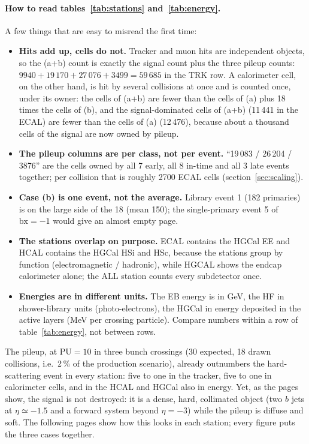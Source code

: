 \documentclass[11pt,a4paper]{article}
\newcommand{\bx}{\ensuremath{\mathrm{bx}}}
\begin{document}
\paragraph{How to read tables~\ref{tab:stations} and~\ref{tab:energy}.} A few things that are easy to misread
the first time:
\begin{itemize}
\item \textbf{Hits add up, cells do not.} Tracker and muon hits are independent objects, so the (a+b) count is
  exactly the signal count plus the three pileup counts: $9940 + 19\,170 + 27\,076 + 3499 = 59\,685$ in the
  TRK row. A calorimeter cell, on the other hand, is hit by several collisions at once and is counted once,
  under its owner: the cells of (a+b) are fewer than the cells of (a) plus 18 times the cells of (b), and the
  signal-dominated cells of (a+b) (11\,441 in the ECAL) are fewer than the cells of (a) (12\,476), because
  about a thousand cells of the signal are now owned by pileup.
\item \textbf{The pileup columns are per class, not per event.} ``19\,083 / 26\,204 / 3876'' are the cells
  owned by all 7 early, all 8 in-time and all 3 late events together; per collision that is roughly 2700 ECAL
  cells (section~\ref{sec:scaling}).
\item \textbf{Case (b) is one event, not the average.} Library event 1 (182 primaries) is on the large side of
  the 18 (mean 150); the single-primary event 5 of $\bx=-1$ would give an almost empty page.
\item \textbf{The stations overlap on purpose.} ECAL contains the HGCal EE and HCAL contains the HGCal HSi and
  HSc, because the stations group by function (electromagnetic / hadronic), while HGCAL shows the endcap
  calorimeter alone; the ALL station counts every subdetector once.
\item \textbf{Energies are in different units.} The EB energy is in GeV, the HF in shower-library units
  (photo-electrons), the HGCal in energy deposited in the active layers (MeV per crossing particle). Compare
  numbers within a row of table~\ref{tab:energy}, not between rows.
\end{itemize}

The pileup, at $\mathrm{PU}=10$ in three bunch crossings (30 expected, 18 drawn collisions, i.e.\ 2\,\% of
the production scenario), already outnumbers the hard-scattering event in every station: five to one in the
tracker, five to one in calorimeter cells, and in the HCAL and HGCal also in energy. Yet, as the pages show,
the signal is not destroyed: it is a dense, hard, collimated object (two $b$ jets at $\eta\simeq-1.5$ and a
forward system beyond $\eta=-3$) while the pileup is diffuse and soft. The following pages show how this looks
in each station; every figure puts the three cases together.
\end{document}
